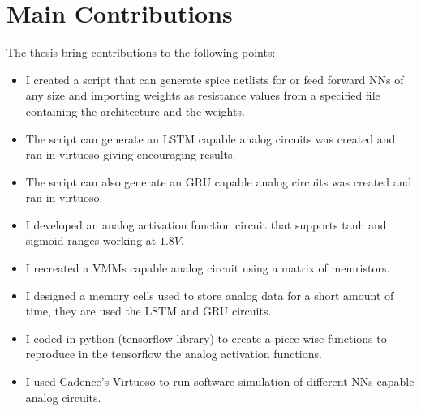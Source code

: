 \section{Main Contributions}
\label{sec:contributions}

The thesis bring contributions to the following points:

\begin{itemize}
  \item I created a script that can generate spice netlists for  or feed forward \aclp{NN} of any size and importing weights as resistance values from a specified file containing the architecture and the weights.
  \item The script can generate an \ac{LSTM} capable analog circuits was created and ran in virtuoso giving encouraging results.
  \item The script can also generate an \ac{GRU} capable analog circuits was created and ran in virtuoso.
  \item I developed an analog activation function circuit that supports \ac{tanh} and sigmoid ranges working at $1.8V$.
  \item I recreated a \acp{VMM} capable analog circuit using a matrix of memristors.
  \item I designed a memory cells used to store analog data for a short amount of time, they are used the \ac{LSTM} and \ac{GRU} circuits.
  \item I coded in python \cite{python} (tensorflow library\cite{tensorflow}) to create a piece wise functions to reproduce in the tensorflow the analog activation functions.
  \item I used Cadence's Virtuoso to run software simulation of different \acp{NN} capable analog circuits.
\end{itemize}

